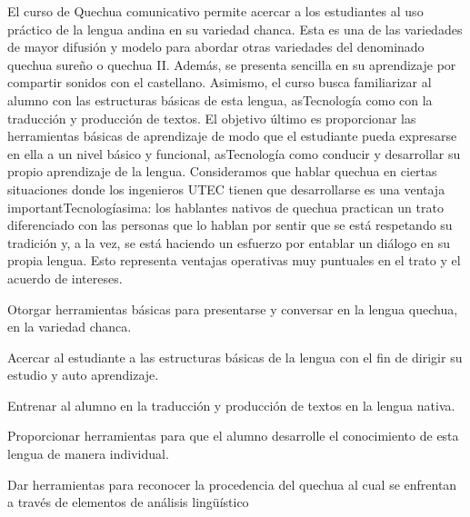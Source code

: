 \begin{syllabus}


\begin{justification}
El curso de Quechua comunicativo permite acercar a los estudiantes al uso práctico de la lengua andina en su variedad chanca. Esta es una de las variedades de mayor difusión y modelo para abordar otras variedades del denominado quechua sureño o quechua II. Además, se presenta sencilla en su aprendizaje por compartir sonidos con el castellano. Asimismo, el curso busca familiarizar al alumno con las estructuras básicas de esta lengua, asTecnología como con la traducción y producción de textos. El objetivo último es proporcionar las herramientas básicas de aprendizaje de modo que el estudiante pueda expresarse en ella a un nivel básico y funcional, asTecnología como conducir y desarrollar su propio aprendizaje de la lengua.
Consideramos que hablar quechua en ciertas situaciones donde los ingenieros UTEC tienen que desarrollarse es una ventaja importantTecnologíasima: los hablantes nativos de quechua practican un trato diferenciado con las personas que lo hablan por sentir que se está respetando su tradición y, a la vez, se está haciendo un esfuerzo por entablar un diálogo en su propia lengua. Esto representa ventajas operativas muy puntuales en el trato y el acuerdo de intereses. 
\end{justification}

\begin{goals}
\item Otorgar herramientas básicas para presentarse y conversar en la lengua quechua, en la variedad chanca.
\item Acercar al estudiante a las estructuras básicas de la lengua con el fin de dirigir su estudio y auto aprendizaje.
\item Entrenar al alumno en la traducción y producción de textos en la lengua nativa.
\item Proporcionar herramientas para que el alumno desarrolle el conocimiento de esta lengua de manera individual.
\item Dar herramientas para reconocer la procedencia del quechua al cual se enfrentan a través de elementos de análisis lingüístico
\end{goals}

\begin{outcomes}
    \item {} %
    \item {} %
    \item {} %
    \item {} %
    \item {} %
\end{outcomes}


\end{syllabus}
